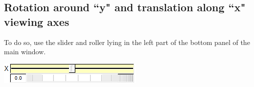 \subsection{Rotation around ``y" and translation along ``x" viewing axes}


\begin{minipage}{0.5\textwidth}
To do so, use the slider and roller lying in the left part of the bottom panel of the
main window.
\end{minipage}    
\begin{minipage}{0.4\textwidth}\centering
  \includegraphics[scale=0.5]{images/Icons/z_rot.png}
 \end{minipage}   

